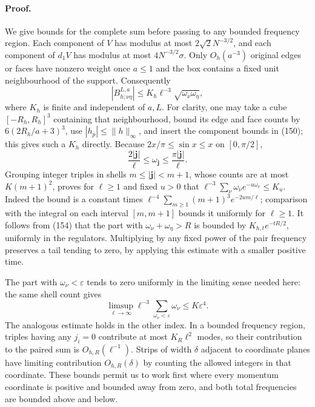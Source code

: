 \documentclass[11pt]{article}
\begin{document}
\paragraph{Proof.}
We give bounds for the complete sum before passing to any bounded
frequency region. Each component of $V$ has modulus at most
$2\sqrt2N^{-3/2}$, and each component of $d_1V$ has modulus at most
$4N^{-3/2}\sigma$. Only $O_h(a^{-3})$ original edges or faces have
nonzero weight once $a\le1$ and the box contains a fixed unit
neighbourhood of the support. Consequently
\begin{equation}\label{eq:full-uniform-pair-bound}
 |B_{h;\nu\eta}^{L,a}|
       \le K_h\ell^{-3}\sqrt{\omega_\nu\omega_\eta},
\end{equation}
where $K_h$ is finite and independent of $a,L$. For clarity, one may
take a cube $[-R_h,R_h]^3$ containing that neighbourhood, bound its
edge and face counts by $6(2R_h/a+3)^3$, use
$|h_p|\le\|h\|_\infty$, and insert the component bounds in
(150); this gives such a $K_h$ directly.
Because $2x/\pi\le\sin x\le x$ on $[0,\pi/2]$,
\[
 \frac{2|\boldsymbol j|}{\ell}\le\omega_{\boldsymbol j}
       \le\frac{\pi|\boldsymbol j|}{\ell}.
\]
Grouping integer triples in shells $m\le|\boldsymbol j|<m+1$,
whose counts are at most $K(m+1)^2$, proves for $\ell\ge1$
and fixed $u>0$ that
$\ell^{-3}\sum_\nu\omega_\nu e^{-u\omega_\nu}\le K_u$.
Indeed the bound is a constant times
$\ell^{-4}\sum_{m\ge1}(m+1)^3e^{-2um/\ell}$; comparison with the
integral on each interval $[m,m+1]$ bounds it uniformly for
$\ell\ge1$. It follows from (154) that
the part with $\omega_\nu+\omega_\eta>R$ is bounded by
$K_{h,t}e^{-tR/2}$, uniformly in the regulators. Multiplying by any
fixed power of the pair frequency preserves a tail tending to zero,
by applying this estimate with a smaller positive time.

The part with $\omega_\nu<\varepsilon$ tends to zero uniformly in
the limiting sense needed here: the same shell count gives
\[
 \limsup_{\ell\to\infty}\ell^{-3}
       \sum_{\omega_\nu<\varepsilon}\omega_\nu
       \le K\varepsilon^4.
\]
The analogous estimate holds in the other index. In a bounded
frequency region, triples having any $j_i=0$ contribute at most
$K_R\ell^2$ modes, so their contribution to the paired sum is
$O_{h,R}(\ell^{-1})$. Strips of width $\delta$ adjacent to coordinate
planes have limiting contribution $O_{h,R}(\delta)$ by counting the
allowed integers in that coordinate. These bounds permit us to work
first where every momentum coordinate is positive and bounded away
from zero, and both total frequencies are bounded above and below.
\end{document}
